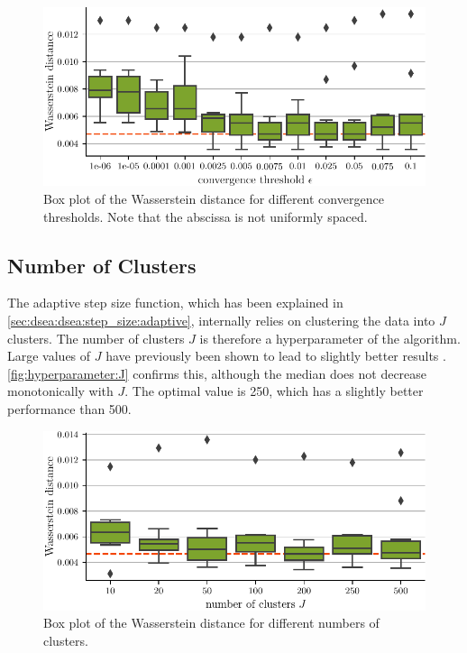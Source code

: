 \begin{figure}
  \centering
  \includegraphics[width=\textwidth]{content/plots/hyperparam/epsilon_vs_wd_boxplot_lessheight.pdf}
  \caption{
    Box plot of the Wasserstein distance for different convergence thresholds.
    Note that the abscissa is not uniformly spaced.
  }
  \label{fig:hyperparameter:epsilon}
\end{figure}


\subsection{Number of Clusters}
The adaptive step size function,
  which has been explained in \autoref{sec:dsea:dsea:step_size:adaptive}, %
internally relies on clustering the data into $J$ clusters.
The number of clusters $J$ is therefore a hyperparameter of the algorithm.
%
Large values of $J$ have previously been shown to lead to slightly better results \cite{dsea_mirko}.
\autoref{fig:hyperparameter:J} confirms this,
although the median does not decrease monotonically with $J$.
The optimal value is \num{250},
which has a slightly better performance than \num{500}.

\begin{figure}
  \centering
  \includegraphics[scale=1]{content/plots/hyperparam/J_vs_wd_boxplot_lessheight.pdf}
  \caption{Box plot of the Wasserstein distance for different numbers of clusters.}
  \label{fig:hyperparameter:J}
\end{figure}


